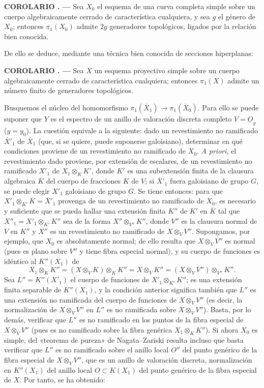 \documentclass[11pt,twoside,openany]{book}
\numberwithin{equation}{section}
\newcommand{\Osh}{\underline{O}}
\theoremstyle{plain}
\theoremstyle{definition}
\theoremstyle{remark}
\newcommand{\result}[2]{%
  \par\medskip\noindent\textbf{#1%
  \if\relax\detokenize{#2}\relax\else\space#2\fi. ---}\enspace
}
\theoremstyle{plain}
\theoremstyle{definition}
\theoremstyle{remark}
\begin{document}
\result{COROLARIO}{3} Sea $X_0$ el esquema de una curva completa simple sobre
un cuerpo algebraicamente cerrado de característica cualquiera, y sea $g$ el
género de $X_0$; entonces $\pi_1(X_0)$ admite $2g$ generadores topológicos,
ligados por la relación bien conocida.

De ello se deduce, mediante una técnica bien conocida de secciones
hiperplanas:

\result{COROLARIO}{4} Sea $X$ un esquema proyectivo simple sobre un cuerpo
algebraicamente cerrado de característica cualquiera; entonces $\pi_1(X)$
admite un número finito de generadores topológicos.

Busquemos el núcleo del homomorfismo
$\pi_1(\overline X_1)\longrightarrow\pi_1(\overline X_0)$. Para ello se puede
suponer que $Y$ es el espectro de un anillo de valoración discreta completo
$V=\Osh_y$ ($y=y_0$). La cuestión equivale a la siguiente: dado un revestimiento
no ramificado $\overline X'_1$ de $\overline X_1$ (que, si se quiere, puede
suponerse galoisiano), determinar en qué condiciones proviene de un
revestimiento no ramificado de $X_0$. \textit{A priori}, el revestimiento dado
proviene, por extensión de escalares, de un revestimiento no ramificado $X'_1$
de $X_1\otimes_K K'$, donde $K'$ es una subextensión finita de la clausura
algebraica $\overline K$ del cuerpo de fracciones $K$ de $V$; si
$\overline X'_1$ fuera galoisiano de grupo $G$, se puede elegir $X'_1$
galoisiano de grupo $G$. Se tiene entonces: para que
$X'_1\otimes_{K'}\overline K=\overline X'_1$ provenga de un revestimiento no
ramificado de $X_0$, es necesario y suficiente que se pueda hallar una extensión
finita $K''$ de $K'$ en $\overline K$ tal que
$X''_1=X'_1\otimes_{K'}K''$ sea de la forma $X''\otimes_{V''}K''$, donde $V''$
es la clausura normal de $V$ en $K''$ y $X''$ es un revestimiento no ramificado
de $X\otimes_VV''$. Supongamos, por ejemplo, que $X_0$ es absolutamente normal;
de ello resulta que $X\otimes_VV''$ es normal (pues es plano sobre $V''$ y tiene
fibra especial normal), y su cuerpo de funciones es idéntico al $K''(X_1)$ de
\[
  X_1\otimes_KK''
  =(X\otimes_VK)\otimes_KK''
  =X\otimes_VK''
  =(X\otimes_VV'')\otimes_{V''}K''.
\]
Sea $L''=K''(X'_1)$ el cuerpo de funciones de $X'_1\otimes_{K'}K''$; es una
extensión finita separable de $K''(X_1)$, y la condición anterior significa
también que $L''$ es una extensión no ramificada del cuerpo de funciones de
$X\otimes_VV''$ (es decir, la normalización de $X\otimes_VV''$ en $L''$ es no
ramificada sobre $X\otimes_VV''$). Basta, por lo demás, verificar que $L''$ es
no ramificado en los puntos de la fibra especial de $X\otimes_VV''$ (pues es no
ramificado sobre la fibra genérica $X_1\otimes_KK''$). Si ahora $X_0$ es simple,
del «teorema de pureza» de Nagata--Zariski resulta incluso que basta verificar
que $L''$ es no ramificado sobre el anillo local $O''$ del punto genérico de la
fibra especial de $X\otimes_VV''$, que es un anillo de valoración discreta,
normalización en $K''(X_1)$ del anillo local $O\subset K(X_1)$ del punto
genérico de la fibra especial de $X$. Por tanto, se ha obtenido:
\end{document}

